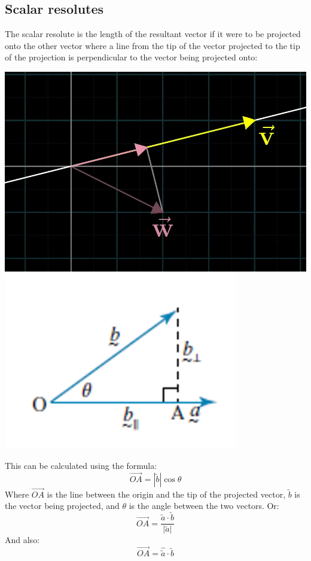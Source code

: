 \documentclass[a4paper,10pt]{report}
\begin{document}
\subsection{Scalar resolutes}
The scalar resolute is the length of the resultant vector if it were to be projected onto the other vector where a line from the tip of the vector projected to the tip of the projection is perpendicular to the vector being projected onto:
\begin{center}
	\includegraphics[scale=0.5]{dot product explination}
	\includegraphics[scale=0.5]{dot product explination 2}
\end{center}
This can be calculated using the formula:
$$
	\Vec{OA} = |\utilde{b}|\cos\theta
$$
Where $\Vec{OA}$ is the line between the origin and the tip of the projected vector, $\utilde{b}$ is the vector being projected, and $\theta$ is the angle between the two vectors.  Or:
$$
	\Vec{OA} = \frac{\utilde{a} \cdot \utilde{b}}{|\utilde{a}|}
$$
And also:
$$
	\Vec{OA} = \hat{\utilde{a}} \cdot \utilde{b}
$$
\end{document}
